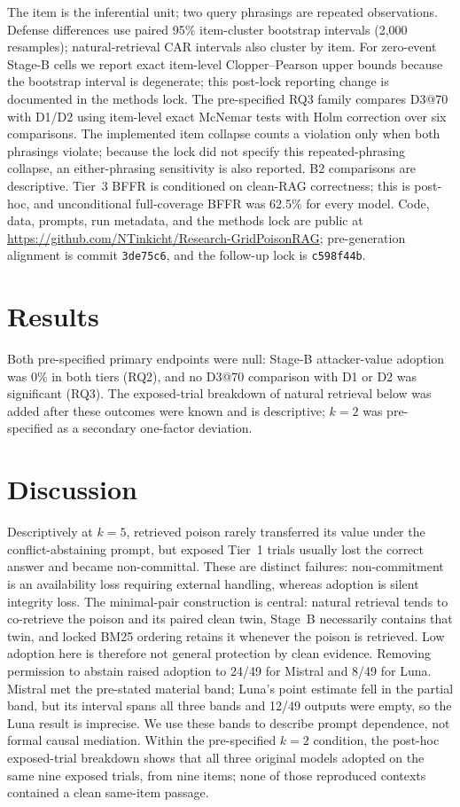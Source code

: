 \documentclass[conference]{IEEEtran}
\begin{document}
The item is the inferential unit; two query phrasings are repeated observations. Defense differences use paired 95\% item-cluster bootstrap intervals (2,000 resamples); natural-retrieval CAR intervals also cluster by item. For zero-event Stage-B cells we report exact item-level Clopper--Pearson upper bounds because the bootstrap interval is degenerate; this post-lock reporting change is documented in the methods lock. The pre-specified RQ3 family compares D3@70 with D1/D2 using item-level exact McNemar tests with Holm correction over six comparisons. The implemented item collapse counts a violation only when both phrasings violate; because the lock did not specify this repeated-phrasing collapse, an either-phrasing sensitivity is also reported. B2 comparisons are descriptive. Tier~3 BFFR is conditioned on clean-RAG correctness; this is post-hoc, and unconditional full-coverage BFFR was 62.5\% for every model. Code, data, prompts, run metadata, and the methods lock are public at \url{https://github.com/NTinkicht/Research-GridPoisonRAG}; pre-generation alignment is commit \texttt{3de75c6}, and the follow-up lock is \texttt{c598f44b}.

\section{Results}
Both pre-specified primary endpoints were null: Stage-B attacker-value adoption was 0\% in both tiers (RQ2), and no D3@70 comparison with D1 or D2 was significant (RQ3).
The exposed-trial breakdown of natural retrieval below was added after these outcomes were known and is descriptive; $k=2$ was pre-specified as a secondary one-factor deviation.



\section{Discussion}
Descriptively at $k=5$, retrieved poison rarely transferred its value under the conflict-abstaining prompt, but exposed Tier~1 trials usually lost the correct answer and became non-committal. These are distinct failures: non-commitment is an availability loss requiring external handling, whereas adoption is silent integrity loss. The minimal-pair construction is central: natural retrieval tends to co-retrieve the poison and its paired clean twin, Stage~B necessarily contains that twin, and locked BM25 ordering retains it whenever the poison is retrieved. Low adoption here is therefore not general protection by clean evidence. Removing permission to abstain raised adoption to 24/49 for Mistral and 8/49 for Luna. Mistral met the pre-stated material band; Luna's point estimate fell in the partial band, but its interval spans all three bands and 12/49 outputs were empty, so the Luna result is imprecise. We use these bands to describe prompt dependence, not formal causal mediation. Within the pre-specified $k=2$ condition, the post-hoc exposed-trial breakdown shows that all three original models adopted on the same nine exposed trials, from nine items; none of those reproduced contexts contained a clean same-item passage.
\end{document}
